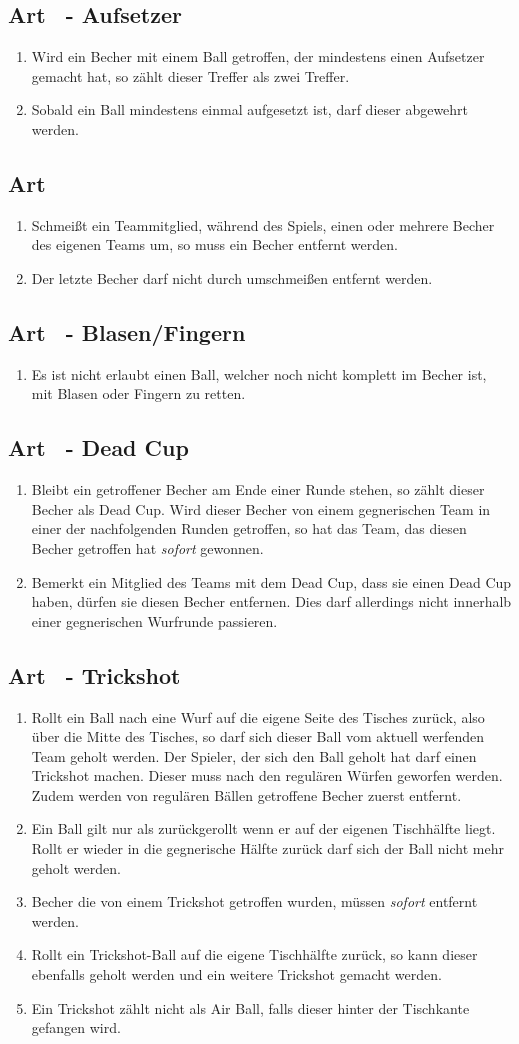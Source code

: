 \documentclass[a4paper,11pt]{scrartcl}
\newcommand{\enum}[1]{\begin{enumerate}[label=(\arabic*)]#1\end{enumerate}}
\newcommand{\art}[2]{\subsection*{#1} \enum{#2}}
\newcommand{\quot}[1]{\glqq #1\grqq}
\newcounter{art}
\begin{document}
    \art{Art \theart\ - Aufsetzer}{
        \item
            Wird ein Becher mit einem Ball getroffen, der mindestens einen Aufsetzer gemacht hat, so zählt dieser Treffer als zwei Treffer.
        \item
            Sobald ein Ball mindestens einmal aufgesetzt ist, darf dieser abgewehrt werden.
    }

    \art{Art \theart}{
        \item
            Schmeißt ein Teammitglied, während des Spiels, einen oder mehrere Becher des eigenen Teams um, so muss ein Becher entfernt werden.
        \item
            Der letzte Becher darf nicht durch umschmeißen entfernt werden.
    }

    \art{Art \theart\ - \quot{Blasen/Fingern}}{
        \item
            Es ist nicht erlaubt einen Ball, welcher noch nicht komplett im Becher ist, mit \quot{Blasen} oder \quot{Fingern} zu retten.
    }

    \art{Art \theart\ - \quot{Dead Cup}}{
        \item
            Bleibt ein getroffener Becher am Ende einer Runde stehen, so zählt dieser Becher als \quot{Dead Cup}. Wird dieser Becher von einem gegnerischen Team in einer der nachfolgenden Runden getroffen, so hat das Team, das diesen Becher getroffen hat \emph{sofort} gewonnen.
        \item
            Bemerkt ein Mitglied des Teams mit dem \quot{Dead Cup}, dass sie einen \quot{Dead Cup} haben, dürfen sie diesen Becher entfernen. Dies darf allerdings nicht innerhalb einer gegnerischen Wurfrunde passieren.
    }

    \art{Art \theart\ - \quot{Trickshot}}{
        \item
            Rollt ein Ball nach eine Wurf auf die eigene Seite des Tisches zurück, also über die Mitte des Tisches, so darf sich dieser Ball vom aktuell werfenden Team geholt werden. Der Spieler, der sich den Ball geholt hat darf einen \quot{Trickshot} machen. Dieser muss nach den regulären Würfen geworfen werden. Zudem werden von regulären Bällen getroffene Becher zuerst entfernt.
        \item
            Ein Ball gilt nur als zurückgerollt wenn er auf der eigenen Tischhälfte liegt. Rollt er wieder in die gegnerische Hälfte zurück darf sich der Ball nicht mehr geholt werden.
        \item
            Becher die von einem \quot{Trickshot} getroffen wurden, müssen \emph{sofort} entfernt werden.
        \item
            Rollt ein \quot{Trickshot}-Ball auf die eigene Tischhälfte zurück, so kann dieser ebenfalls geholt werden und ein weitere \quot{Trickshot} gemacht werden.
        \item
            Ein \quot{Trickshot} zählt nicht als \quot{Air Ball}, falls dieser hinter der Tischkante gefangen wird.
    }
\end{document}
